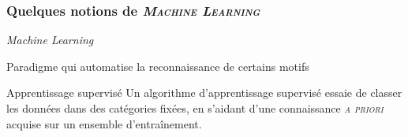 \documentclass{beamer}
\begin{document}
\begin{frame}
\frametitle{Quelques notions de\textsc{ \it Machine Learning }}

\begin{block}{\begin{flushcenter} \it Machine Learning \end{flushcenter}}
Paradigme qui automatise la reconnaissance de certains motifs
\end{block}





\begin{block}{Apprentissage supervisé}
Un algorithme d'\alert{apprentissage supervisé} essaie de classer les données dans des catégories \alert{fixées}, en s'aidant d'une connaissance\textsc{ \it a priori } acquise sur un \alert{ensemble d'entraînement}.
\end{block}


\end{frame}
\end{document}
